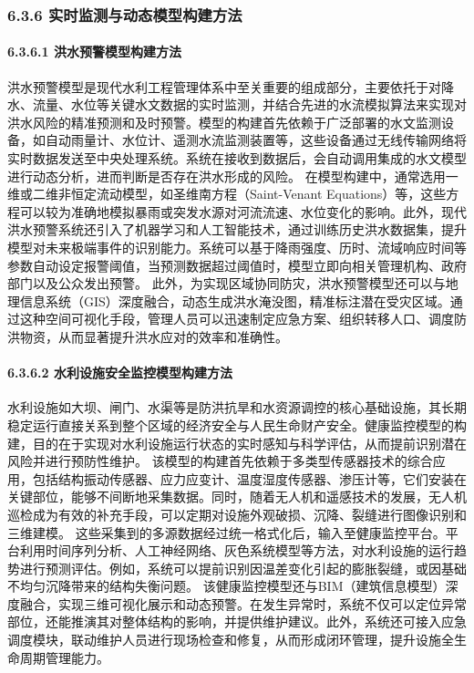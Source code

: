 \subsubsection{6.3.6
实时监测与动态模型构建方法}\label{ux5b9eux65f6ux76d1ux6d4bux4e0eux52a8ux6001ux6a21ux578bux6784ux5efaux65b9ux6cd5} \paragraph{6.3.6.1
洪水预警模型构建方法}\label{ux6d2aux6c34ux9884ux8b66ux6a21ux578bux6784ux5efaux65b9ux6cd5}
洪水预警模型是现代水利工程管理体系中至关重要的组成部分，主要依托于对降水、流量、水位等关键水文数据的实时监测，并结合先进的水流模拟算法来实现对洪水风险的精准预测和及时预警。模型的构建首先依赖于广泛部署的水文监测设备，如自动雨量计、水位计、遥测水流监测装置等，这些设备通过无线传输网络将实时数据发送至中央处理系统。系统在接收到数据后，会自动调用集成的水文模型进行动态分析，进而判断是否存在洪水形成的风险。
在模型构建中，通常选用一维或二维非恒定流动模型，如圣维南方程（Saint-Venant
Equations）等，这些方程可以较为准确地模拟暴雨或突发水源对河流流速、水位变化的影响。此外，现代洪水预警系统还引入了机器学习和人工智能技术，通过训练历史洪水数据集，提升模型对未来极端事件的识别能力。系统可以基于降雨强度、历时、流域响应时间等参数自动设定报警阈值，当预测数据超过阈值时，模型立即向相关管理机构、政府部门以及公众发出预警。
此外，为实现区域协同防灾，洪水预警模型还可以与地理信息系统（GIS）深度融合，动态生成洪水淹没图，精准标注潜在受灾区域。通过这种空间可视化手段，管理人员可以迅速制定应急方案、组织转移人口、调度防洪物资，从而显著提升洪水应对的效率和准确性。
\paragraph{6.3.6.2
水利设施安全监控模型构建方法}\label{ux6c34ux5229ux8bbeux65bdux5b89ux5168ux76d1ux63a7ux6a21ux578bux6784ux5efaux65b9ux6cd5}
水利设施如大坝、闸门、水渠等是防洪抗旱和水资源调控的核心基础设施，其长期稳定运行直接关系到整个区域的经济安全与人民生命财产安全。健康监控模型的构建，目的在于实现对水利设施运行状态的实时感知与科学评估，从而提前识别潜在风险并进行预防性维护。
该模型的构建首先依赖于多类型传感器技术的综合应用，包括结构振动传感器、应力应变计、温度湿度传感器、渗压计等，它们安装在关键部位，能够不间断地采集数据。同时，随着无人机和遥感技术的发展，无人机巡检成为有效的补充手段，可以定期对设施外观破损、沉降、裂缝进行图像识别和三维建模。
这些采集到的多源数据经过统一格式化后，输入至健康监控平台。平台利用时间序列分析、人工神经网络、灰色系统模型等方法，对水利设施的运行趋势进行预测评估。例如，系统可以提前识别因温差变化引起的膨胀裂缝，或因基础不均匀沉降带来的结构失衡问题。
该健康监控模型还与BIM（建筑信息模型）深度融合，实现三维可视化展示和动态预警。在发生异常时，系统不仅可以定位异常部位，还能推演其对整体结构的影响，并提供维护建议。此外，系统还可接入应急调度模块，联动维护人员进行现场检查和修复，从而形成闭环管理，提升设施全生命周期管理能力。
